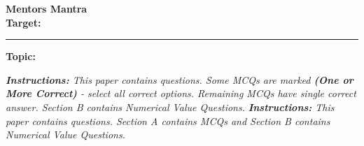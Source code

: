 \documentclass[10pt, a4paper]{article}
\begin{document}
\begin{center}
    {\Huge \textbf{Mentors Mantra}} \\[0.2cm]
    {\Large \textbf{Target: }} \\[0.05cm]

    \rule{\textwidth}{1pt}
    \textbf{Topic: }
\end{center}

\vspace{0.2cm}
\textit{\textbf{Instructions:} This paper contains  questions. Some MCQs are marked \textbf{(One or More Correct)} - select all correct options. Remaining MCQs have single correct answer. Section B contains Numerical Value Questions.}
\textit{\textbf{Instructions:} This paper contains  questions. Section A contains MCQs and Section B contains Numerical Value Questions.}
\vspace{0.3cm}
\end{document}
